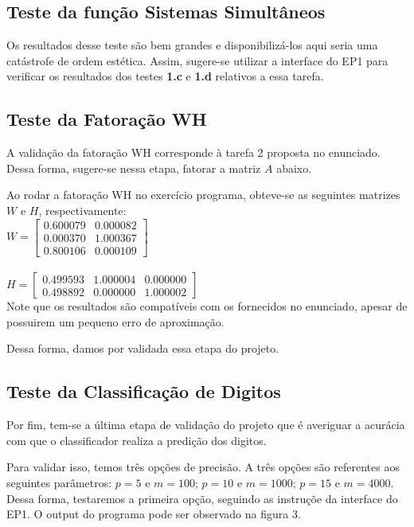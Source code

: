 \documentclass[twocolumn,amsmath,amssymb,floatfix]{revtex4}
\begin{document}
\subsection{Teste da função Sistemas Simultâneos}

Os resultados desse teste são bem grandes e disponibilizá-los aqui seria uma catástrofe de ordem estética. Assim, sugere-se utilizar a interface do EP1 para  
verificar os resultados dos testes \textbf{1.c} e \textbf{1.d} relativos a essa tarefa.


\subsection{Teste da Fatoração WH}

A validação da fatoração WH corresponde à tarefa 2 proposta no enunciado. Dessa forma, sugere-se nessa etapa, fatorar a matriz $A$ abaixo.

Ao rodar a fatoração WH no exercício programa, obteve-se as seguintes matrizes $W$ e $H$, respectivamente:\\

$W =
\begin{bmatrix}
0.600079 & 0.000082 \\ 	
0.000370 & 1.000367 \\	
0.800106 & 0.000109 	
\end{bmatrix}
$\\\\

$H =
\begin{bmatrix}
0.499593 & 1.000004 & 0.000000 \\	
0.498892 & 0.000000 & 1.000002 	
\end{bmatrix}
$\\


Note que os resultados são compatíveis com os fornecidos no enunciado, apesar de possuirem um pequeno erro de aproximação.

Dessa forma, damos por validada essa etapa do projeto.

\subsection{Teste da Classificação de Digitos}

Por fim, tem-se a última etapa de validação do projeto que é averiguar a acurácia com que o classificador realiza a predição dos digitos.

Para validar isso, temos três opções de precisão. A três opções são referentes aos seguintes parâmetros: $p = 5$ e $m = 100$; $p = 10$ e $m = 1000$; $p = 15$ e $m = 4000$. Dessa forma, testaremos a primeira opção, seguindo as instruçõe da interface do EP1. O output do programa pode ser observado na figura 3.
\end{document}

